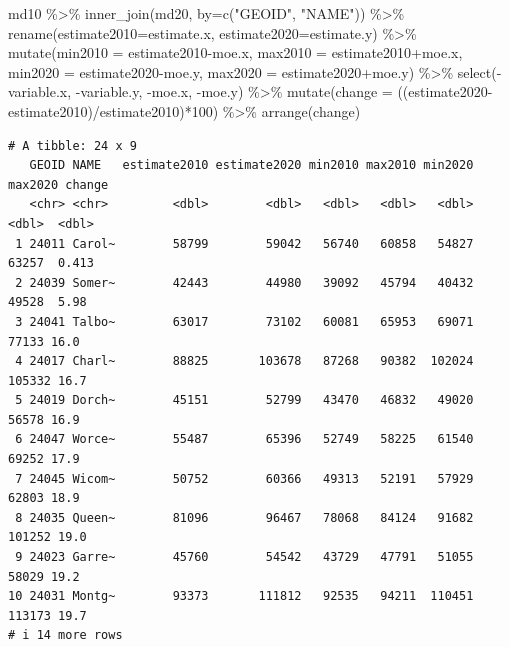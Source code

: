 \documentclass[
  letterpaper,
  DIV=11,
  numbers=noendperiod]{scrreprt}
\newenvironment{Shaded}{\begin{snugshade}}{\end{snugshade}}
\newcommand{\AttributeTok}[1]{\textcolor[rgb]{0.40,0.45,0.13}{#1}}
\newcommand{\DecValTok}[1]{\textcolor[rgb]{0.68,0.00,0.00}{#1}}
\newcommand{\FunctionTok}[1]{\textcolor[rgb]{0.28,0.35,0.67}{#1}}
\newcommand{\NormalTok}[1]{\textcolor[rgb]{0.00,0.23,0.31}{#1}}
\newcommand{\SpecialCharTok}[1]{\textcolor[rgb]{0.37,0.37,0.37}{#1}}
\newcommand{\StringTok}[1]{\textcolor[rgb]{0.13,0.47,0.30}{#1}}
\begin{document}
\begin{Shaded}
\begin{Highlighting}[]
\NormalTok{md10 }\SpecialCharTok{\%\textgreater{}\%}
  \FunctionTok{inner\_join}\NormalTok{(md20, }\AttributeTok{by=}\FunctionTok{c}\NormalTok{(}\StringTok{"GEOID"}\NormalTok{, }\StringTok{"NAME"}\NormalTok{)) }\SpecialCharTok{\%\textgreater{}\%}
  \FunctionTok{rename}\NormalTok{(}\AttributeTok{estimate2010=}\NormalTok{estimate.x, }\AttributeTok{estimate2020=}\NormalTok{estimate.y) }\SpecialCharTok{\%\textgreater{}\%}
  \FunctionTok{mutate}\NormalTok{(}\AttributeTok{min2010 =}\NormalTok{ estimate2010}\SpecialCharTok{{-}}\NormalTok{moe.x, }\AttributeTok{max2010 =}\NormalTok{ estimate2010}\SpecialCharTok{+}\NormalTok{moe.x, }\AttributeTok{min2020 =}\NormalTok{ estimate2020}\SpecialCharTok{{-}}\NormalTok{moe.y, }\AttributeTok{max2020 =}\NormalTok{ estimate2020}\SpecialCharTok{+}\NormalTok{moe.y) }\SpecialCharTok{\%\textgreater{}\%}
  \FunctionTok{select}\NormalTok{(}\SpecialCharTok{{-}}\NormalTok{variable.x, }\SpecialCharTok{{-}}\NormalTok{variable.y, }\SpecialCharTok{{-}}\NormalTok{moe.x, }\SpecialCharTok{{-}}\NormalTok{moe.y) }\SpecialCharTok{\%\textgreater{}\%}
  \FunctionTok{mutate}\NormalTok{(}\AttributeTok{change =}\NormalTok{ ((estimate2020}\SpecialCharTok{{-}}\NormalTok{estimate2010)}\SpecialCharTok{/}\NormalTok{estimate2010)}\SpecialCharTok{*}\DecValTok{100}\NormalTok{) }\SpecialCharTok{\%\textgreater{}\%}
  \FunctionTok{arrange}\NormalTok{(change)}
\end{Highlighting}
\end{Shaded}

\begin{verbatim}
# A tibble: 24 x 9
   GEOID NAME   estimate2010 estimate2020 min2010 max2010 min2020 max2020 change
   <chr> <chr>         <dbl>        <dbl>   <dbl>   <dbl>   <dbl>   <dbl>  <dbl>
 1 24011 Carol~        58799        59042   56740   60858   54827   63257  0.413
 2 24039 Somer~        42443        44980   39092   45794   40432   49528  5.98 
 3 24041 Talbo~        63017        73102   60081   65953   69071   77133 16.0  
 4 24017 Charl~        88825       103678   87268   90382  102024  105332 16.7  
 5 24019 Dorch~        45151        52799   43470   46832   49020   56578 16.9  
 6 24047 Worce~        55487        65396   52749   58225   61540   69252 17.9  
 7 24045 Wicom~        50752        60366   49313   52191   57929   62803 18.9  
 8 24035 Queen~        81096        96467   78068   84124   91682  101252 19.0  
 9 24023 Garre~        45760        54542   43729   47791   51055   58029 19.2  
10 24031 Montg~        93373       111812   92535   94211  110451  113173 19.7  
# i 14 more rows
\end{verbatim}
\end{document}
